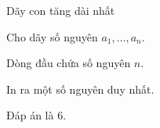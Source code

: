 \begin{problem}[
  input  = stdin,
  output = stdout,
  time   = 1,
  memory = 256,
]{Dãy con tăng dài nhất}

Cho dãy số nguyên $a_1, \dots, a_n$.

\InputFile
Dòng đầu chứa số nguyên $n$.

\OutputFile
In ra một số nguyên duy nhất.

\Examples
\begin{example}
%
\end{example}

\Note
Đáp án là $6$.
\end{problem}
